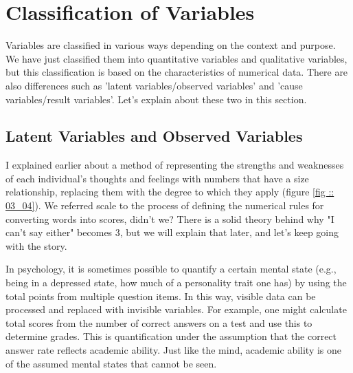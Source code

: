 \documentclass{ltjsbook}
\begin{document}
\section{Classification of Variables}
\label{chap3sec2}
Variables are classified in various ways depending on the context and purpose. We have just classified them into quantitative variables and qualitative variables, but this classification is based on the characteristics of numerical data. There are also differences such as 'latent variables/observed variables' and 'cause variables/result variables'. Let's explain about these two in this section.
\subsection{Latent Variables and Observed Variables}
I explained earlier about a method of representing the strengths and weaknesses of each individual's thoughts and feelings with numbers that have a size relationship, replacing them with the degree to which they apply (figure \ref{fig :: 03_04}). We referred scale to the process of defining the numerical rules for converting words into scores, didn't we? There is a solid theory behind why "I can't say either" becomes 3, but we will explain that later, and let's keep going with the story.

In psychology, it is sometimes possible to quantify a certain mental state (e.g., being in a depressed state, how much of a personality trait one has) by using the total points from multiple question items. In this way, visible data can be processed and replaced with invisible variables. For example, one might calculate total scores from the number of correct answers on a test and use this to determine grades. This is quantification under the assumption that the correct answer rate reflects academic ability. Just like the mind, academic ability is one of the assumed mental states that cannot be seen.
\end{document}

